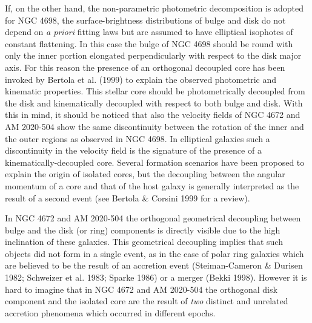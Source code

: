 \documentclass[twocolumns]{aa}
\begin{document}
If, on the other hand, the non-parametric photometric
decomposition is adop\-ted for NGC 4698, the surface-brightness
distributions of bulge and disk do not depend on {\it a priori\/}
fitting laws but are assumed to have elliptical isophotes of constant
flattening. In this case the bulge of NGC 4698 should be round with
only the inner portion elongated perpendicularly with respect to the
disk major axis. For this reason the presence of an orthogonal
decoupled core has been invoked by Bertola et al. (1999) to explain
the observed photometric and kinematic  properties. This stellar
core should be photometrically decoupled from the disk and
kinematically decoupled with respect to both bulge and disk.  
With this in mind, it should be noticed that also the velocity fields
of NGC 4672 and AM 2020-504 show the same discontinuity between the
rotation of the inner and the outer regions as observed in NGC
4698. In elliptical galaxies such a discontinuity in the velocity
field is the signature of the presence of a kinematically-decoupled
core. Several formation scenarios have been proposed to explain the
origin of isolated cores, but the decoupling between the angular
momentum of a core and that of the host galaxy is generally
interpreted as the result of a second event (see Bertola \& Corsini
1999 for a review).
 
In NGC 4672 and AM 2020-504 the orthogonal geometrical decoupling
between bulge and the disk (or ring) components is directly visible
due to the high inclination of these galaxies.  This geometrical
decoupling  implies that such objects did not form in a single
event, as in the case of polar ring galaxies which are believed to be
the result of an accretion event (Steiman-Cameron \& Durisen 1982;
Schweizer et al. 1983; Sparke 1986) or a merger (Bekki
1998).  However it is hard to imagine that in NGC 4672 and AM 2020-504
the orthogonal disk component and the isolated core are the result
of {\it two\/} distinct and unrelated accretion phenomena
which occurred in different epochs.
\end{document}
